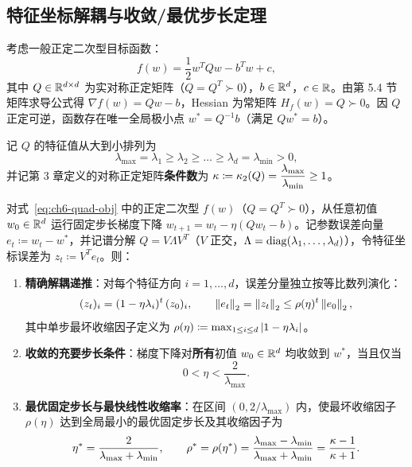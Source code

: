 \subsection{特征坐标解耦与收敛/最优步长定理}

考虑一般正定二次型目标函数：
\begin{equation}\label{eq:ch6-quad-obj}
  f(w) = \frac{1}{2} w^T Q w - b^T w + c,
\end{equation}
其中 $Q \in \mathbb{R}^{d\times d}$ 为实对称正定矩阵（$Q = Q^T \succ 0$），$b\in\mathbb{R}^d$，$c\in\mathbb{R}$。由第 5.4 节矩阵求导公式得 $\nabla f(w) = Qw - b$，Hessian 为常矩阵 $H_f(w) = Q \succ 0$。因 $Q$ 正定可逆，函数存在唯一全局极小点 $w^* = Q^{-1} b$（满足 $Qw^* = b$）。

记 $Q$ 的特征值从大到小排列为
\[
  \lambda_{\max} = \lambda_1 \ge \lambda_2 \ge \dots \ge \lambda_d = \lambda_{\min} > 0,
\]
并记第 3 章定义的对称正定矩阵\textbf{条件数}为 $\kappa \coloneqq \kappa_2(Q) = \dfrac{\lambda_{\max}}{\lambda_{\min}} \ge 1$。

\begin{thmBox}
\begin{theorem}[二次型梯度下降的精确谱收敛与最优步长定理]\label{thm:ch6-gd-spectral}
对式~\eqref{eq:ch6-quad-obj} 中的正定二次型 $f(w)$（$Q=Q^T\succ 0$），从任意初值 $w_0\in\mathbb{R}^d$ 运行固定步长梯度下降 $w_{t+1} = w_t - \eta(Qw_t - b)$。记参数误差向量 $e_t \coloneqq w_t - w^*$，并记谱分解 $Q = V\Lambda V^T$（$V$ 正交，$\Lambda = \operatorname{diag}(\lambda_1,\dots,\lambda_d)$），令特征坐标误差为 $z_t \coloneqq V^T e_t$。则：
\begin{enumerate}
  \item \textbf{精确解耦递推}：对每个特征方向 $i = 1, \dots, d$，误差分量独立按等比数列演化：
  \begin{equation}\label{eq:ch6-eigen-recur}
    (z_t)_i = (1 - \eta \lambda_i)^t\, (z_0)_i, \qquad \left\|e_t\right\|_2 = \left\|z_t\right\|_2 \le \rho(\eta)^t \left\|e_0\right\|_2,
  \end{equation}
  其中单步最坏收缩因子定义为 $\rho(\eta) \coloneqq \max_{1\le i\le d} \left|1 - \eta \lambda_i\right|$。
  \item \textbf{收敛的充要步长条件}：梯度下降对\textbf{所有}初值 $w_0\in\mathbb{R}^d$ 均收敛到 $w^*$，当且仅当
  \begin{equation}\label{eq:ch6-eta-bound}
    0 < \eta < \frac{2}{\lambda_{\max}}.
  \end{equation}
  \item \textbf{最优固定步长与最快线性收缩率}：在区间 $(0, 2/\lambda_{\max})$ 内，使最坏收缩因子 $\rho(\eta)$ 达到全局最小的最优固定步长及其收缩因子为
  \begin{equation}\label{eq:ch6-eta-opt}
    \eta^* = \frac{2}{\lambda_{\max} + \lambda_{\min}},
    \qquad
    \rho^* = \rho(\eta^*) = \frac{\lambda_{\max} - \lambda_{\min}}{\lambda_{\max} + \lambda_{\min}}
           = \frac{\kappa - 1}{\kappa + 1}.
  \end{equation}
\end{enumerate}
\end{theorem}
\end{thmBox}

